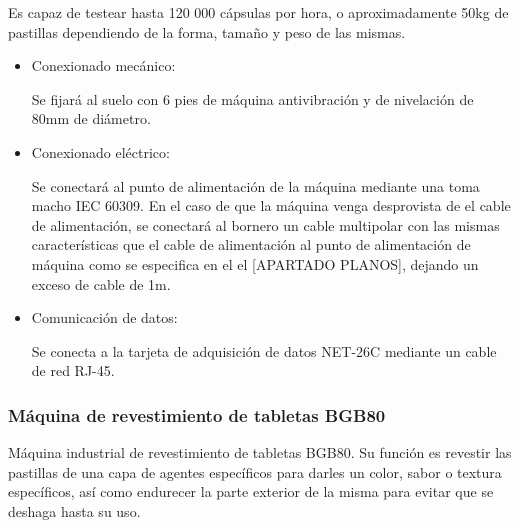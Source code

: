 	Es capaz de testear hasta 120 000 cápsulas por hora, o aproximadamente 50kg de pastillas dependiendo de la forma, tamaño y peso de las mismas.\\



		\begin{itemize}
				\item{Conexionado mecánico:}
				
				Se fijará al suelo con 6 pies de máquina antivibración y de nivelación de 80mm de diámetro.

				\item{Conexionado eléctrico:}

				Se conectará al punto de alimentación de la máquina mediante una  toma macho IEC 60309. En el caso de que la máquina venga desprovista de el cable de alimentación, se conectará al bornero un cable multipolar con las mismas características que el cable de alimentación al punto de alimentación de máquina como se especifica en el el [APARTADO PLANOS], dejando un exceso de cable de 1m. \
				
				\item{Comunicación de datos:}

				Se conecta a la tarjeta de adquisición de datos NET-26C mediante un cable de red RJ-45.
		\end{itemize}

	\newpage


	\subsubsection{Máquina de revestimiento de tabletas BGB80}
		
	
	
	Máquina industrial de revestimiento de tabletas BGB80. Su función es revestir las pastillas de una capa de agentes específicos para darles un color, sabor o textura específicos, así como endurecer la parte exterior de la misma para evitar que se deshaga hasta su uso.\\

